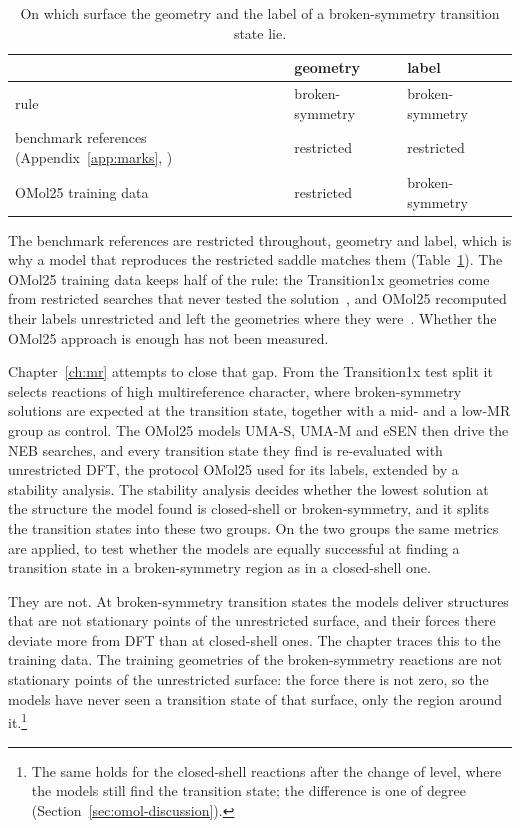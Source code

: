 \begin{table}[h]
\centering
\small
\caption{On which surface the geometry and the label of a
broken-symmetry transition state lie.}
\label{tab:surfaces}
\begin{tabular}{@{}lll@{}}
\toprule
 & geometry & label \\
\midrule
rule & broken-symmetry & broken-symmetry \\
benchmark references (Appendix~\ref{app:marks}, \cite{marks2026}) & restricted & restricted \\
OMol25 training data~\cite{omol25} & restricted & broken-symmetry \\
\bottomrule
\end{tabular}
\end{table}

The benchmark references are restricted throughout, geometry and label,
which is why a model that reproduces the restricted saddle matches them
(Table~\ref{tab:surfaces}).
The OMol25 training data keeps half of the rule: the Transition1x
geometries come from restricted searches that never tested the
solution~\cite{schreiner2022}, and OMol25 recomputed their labels
unrestricted and left the geometries where they were~\cite{omol25}.
Whether the OMol25 approach is enough has not been measured.

Chapter~\ref{ch:mr} attempts to close that gap. From the Transition1x
test split it selects reactions of high multireference character,
where broken-symmetry solutions are expected at the transition state,
together with a mid- and a low-MR group as control. The OMol25 models
UMA-S, UMA-M and eSEN then drive the NEB searches, and every transition
state they find is re-evaluated with unrestricted DFT, the protocol
OMol25 used for its labels, extended by a stability analysis. The
stability analysis decides whether the lowest solution at the structure
the model found is closed-shell or broken-symmetry, and it splits the
transition states into these two groups. On the two groups the same
metrics are applied, to test whether the models are equally successful
at finding a transition state in a broken-symmetry region as in a
closed-shell one.

They are not. At broken-symmetry transition states the models deliver
structures that are not stationary points of the unrestricted surface,
and their forces there deviate more from DFT than at closed-shell ones.
The chapter traces this to the training data. The training geometries of the broken-symmetry reactions are not
stationary points of the unrestricted surface: the force there is
not zero, so the models have never seen a transition state of that
surface, only the region around it.\footnote{The same holds for the
closed-shell reactions after the change of level, where the models
still find the transition state; the difference is one of degree
(Section~\ref{sec:omol-discussion}).}

